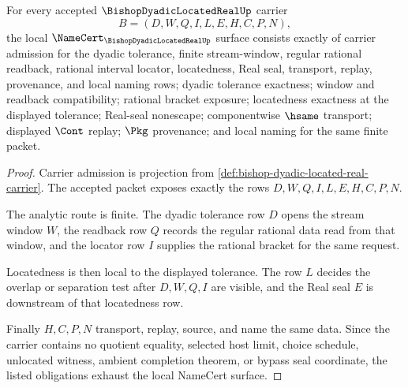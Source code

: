 \begin{theorem}
\label{thm:bishop-dyadic-located-real-namecert-obligations}
For every accepted $\BishopDyadicLocatedRealUp$ carrier
$$
B=(D,W,Q,I,L,E,H,C,P,N),
$$
the local $\NameCert_{\BishopDyadicLocatedRealUp}$ surface consists exactly of carrier admission for the dyadic tolerance, finite stream-window, regular rational readback, rational interval locator, locatedness, Real seal, transport, replay, provenance, and local naming rows; dyadic tolerance exactness; window and readback compatibility; rational bracket exposure; locatedness exactness at the displayed tolerance; Real-seal nonescape; componentwise $\hsame$ transport; displayed $\Cont$ replay; $\Pkg$ provenance; and local naming for the same finite packet.
\end{theorem}
\begin{proof}
Carrier admission is projection from \autoref{def:bishop-dyadic-located-real-carrier}. The accepted packet exposes exactly the rows $D,W,Q,I,L,E,H,C,P,N$.

The analytic route is finite. The dyadic tolerance row $D$ opens the stream window $W$, the readback row $Q$ records the regular rational data read from that window, and the locator row $I$ supplies the rational bracket for the same request.

Locatedness is then local to the displayed tolerance. The row $L$ decides the overlap or separation test after $D,W,Q,I$ are visible, and the Real seal $E$ is downstream of that locatedness row.

Finally $H,C,P,N$ transport, replay, source, and name the same data. Since the carrier contains no quotient equality, selected host limit, choice schedule, unlocated witness, ambient completion theorem, or bypass seal coordinate, the listed obligations exhaust the local NameCert surface.
\end{proof}

